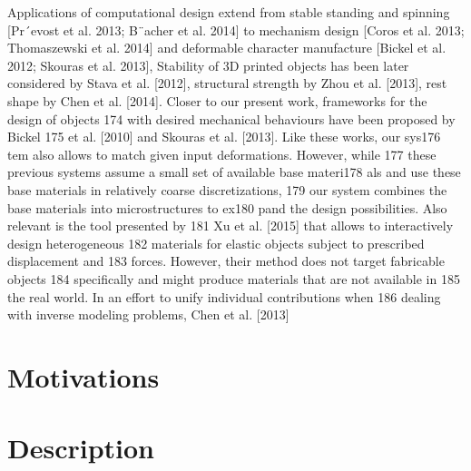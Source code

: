 Applications of computational design extend
from stable standing and spinning [Pr´evost et al. 2013; B¨acher et al.
2014] to mechanism design [Coros et al. 2013; Thomaszewski et al.
2014] and deformable character manufacture [Bickel et al. 2012;
Skouras et al. 2013],
 Stability of 3D printed objects has been later considered by Stava et al. [2012], structural
strength by Zhou et al. [2013], rest shape by Chen et al. [2014].
Closer to our present work, frameworks for the design of objects
174 with desired mechanical behaviours have been proposed by Bickel
175 et al. [2010] and Skouras et al. [2013]. Like these works, our sys176
tem also allows to match given input deformations. However, while
177 these previous systems assume a small set of available base materi178
als and use these base materials in relatively coarse discretizations,
179 our system combines the base materials into microstructures to ex180
pand the design possibilities. Also relevant is the tool presented by
181 Xu et al. [2015] that allows to interactively design heterogeneous
182 materials for elastic objects subject to prescribed displacement and
183 forces. However, their method does not target fabricable objects
184 specifically and might produce materials that are not available in
185 the real world. In an effort to unify individual contributions when
186 dealing with inverse modeling problems, Chen et al. [2013]

\section{Motivations}


\section{Description}\label{ch1:desc}


\subsection{}


\subsection{}

\section{}


\subsection{}

\subsection{}

\section{}

\subsection{}

\subsection{}
